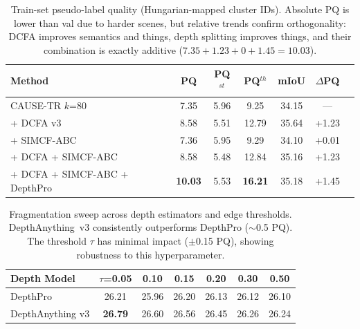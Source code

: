 \begin{table}[t]
\centering
\small
\caption{Train-set pseudo-label quality (Hungarian-mapped cluster IDs). Absolute PQ is lower than val due to harder scenes, but relative trends confirm orthogonality: DCFA improves semantics and things, depth splitting improves things, and their combination is exactly additive ($7.35 + 1.23 + 0 + 1.45 = 10.03$).}
\label{tab:pseudolabel-composition-train}
\begin{tabular}{@{}lcccccc@{}}
\toprule
Method & PQ & PQ$^{st}$ & PQ$^{th}$ & mIoU & $\Delta$PQ \\
\midrule
CAUSE-TR $k$=80 & 7.35 & 5.96 & 9.25 & 34.15 & --- \\
+ DCFA v3 & 8.58 & 5.51 & 12.79 & 35.64 & +1.23 \\
+ SIMCF-ABC & 7.36 & 5.95 & 9.29 & 34.10 & +0.01 \\
+ DCFA + SIMCF-ABC & 8.58 & 5.48 & 12.84 & 35.16 & +1.23 \\
+ DCFA + SIMCF-ABC + DepthPro & \textbf{10.03} & 5.53 & \textbf{16.21} & 35.18 & +1.45 \\
\bottomrule
\end{tabular}
\end{table}

\begin{table}[t]
\centering
\small
\caption{Fragmentation sweep across depth estimators and edge thresholds. DepthAnything~v3 consistently outperforms DepthPro ($\sim$0.5 PQ). The threshold $\tau$ has minimal impact ($\pm$0.15 PQ), showing robustness to this hyperparameter.}
\label{tab:fragmentation-sweep}
\begin{tabular}{@{}lcccccc@{}}
\toprule
Depth Model & $\tau$=0.05 & 0.10 & 0.15 & 0.20 & 0.30 & 0.50 \\
\midrule
DepthPro & 26.21 & 25.96 & 26.20 & 26.13 & 26.12 & 26.10 \\
DepthAnything v3 & \textbf{26.79} & 26.60 & 26.56 & 26.45 & 26.26 & 26.24 \\
\bottomrule
\end{tabular}
\end{table}

